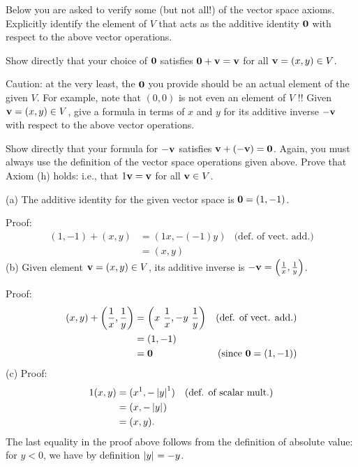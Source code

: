 Below you are asked to verify some (but not all!) of the vector space axioms.   
\bb
\ii Explicitly identify the element of $V$ that acts as the additive identity ${\mathbf 0}$ with respect to the above vector operations. 

Show directly that your choice of ${\mathbf 0}$ satisfies ${\mathbf 0}+{\mathbf v}={\mathbf v}$ for all ${\mathbf v}=(x,y)\in V$. 

Caution: at the very least, the ${\mathbf 0}$ you provide should be an actual element of the given $V$. For example, note that $(0,0)$ is not even an element of $V$ !!
\ii Given ${\mathbf v}=(x,y)\in V$, give a formula in terms of $x$ and $y$ for its additive inverse $-{\mathbf v}$ with respect to the above vector operations.

Show directly that your formula for $-{\mathbf v}$ satisfies ${\mathbf v}+ (-{\mathbf v})={\mathbf 0}$. Again, you must always use the definition of the vector space operations given above.
\ii Prove that Axiom (h) holds: i.e., that $1{\mathbf v}={\mathbf v}$ for all ${\mathbf v}\in V$.  
\ee
\begin{solution}
\noindent
(a) The additive identity for the given vector space is ${\mathbf 0}=(1,-1)$. 

\noindent
Proof:
\begin{align*}
(1,-1)+(x,y)&=(1x,-(-1)y) &\text{(def. of vect. add.)}\\
&=(x,y)
\end{align*}
(b) Given element ${\mathbf v}=(x,y)\in V$, its additive inverse is $-{\mathbf v}=\left(\frac{1}{x},\frac{1}{y}\right)$. 

\noindent
Proof:
\begin{align*}
(x,y)+\left(\frac{1}{x},\frac{1}{y}\right)&=\left(x\ \frac{1}{x},-y\ \frac{1}{y}\right) &\text{(def. of vect. add.)}\\
&=(1,-1)\\
&=\boldzero &\text{(since $\boldzero=(1,-1)$)}
\end{align*}
(c) Proof:
\begin{align*}
1(x,y)&=(x^1,-\left\lvert y\right\rvert_{}^1) &\text{(def. of scalar mult.)}\\
&=(x,-\left\lvert y\right\rvert_{})\\
&=(x,y). 
\end{align*}
The last equality in the proof above follows from the definition of absolute value: for $y<0$, we have by definition $\left\lvert y\right\rvert_{}=-y$. 
\end{solution}

